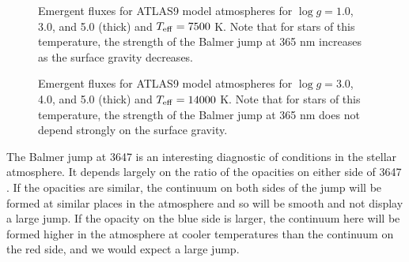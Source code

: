 \begin{figure}
\footnotesize
{}
\caption{Emergent fluxes for ATLAS9 model atmospheres for $\log g = 1.0$, 3.0, and 5.0 (thick) and $T_\mathrm{eff} = 7500$ K. Note that for stars of this temperature, the strength of the Balmer jump at 365 nm increases as the surface gravity decreases.}
\label{figure-atlas-logg-fg}
\end{figure}

\begin{figure}
\footnotesize
{}
\caption{Emergent fluxes for ATLAS9 model atmospheres for $\log g = 3.0$, 4.0, and 5.0 (thick) and $T_\mathrm{eff} = 14000$ K. Note that for stars of this temperature, the strength of the Balmer jump at 365 nm does not depend strongly on the surface gravity.}
\label{figure-atlas-logg-ba}
\end{figure}


The Balmer jump at 3647 {\Angstrom} is an interesting
diagnostic of conditions in the stellar atmosphere. It
depends largely on the ratio of the opacities on either side
of 3647 {\Angstrom}. If the opacities are similar, the
continuum on both sides of the jump will be formed at
similar places in the atmosphere and so will be smooth and
not display a large jump. If the opacity on the blue side is
larger, the continuum here will be formed higher in the
atmosphere at cooler temperatures than the continuum on the
red side, and we would expect a large jump.

